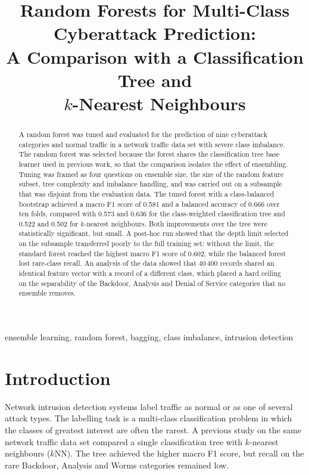 \documentclass[conference,10pt]{IEEEtran}
\begin{document}
\title{Random Forests for Multi-Class Cyberattack Prediction:\\
A Comparison with a Classification Tree and\\ $k$-Nearest Neighbours}

\author{
}

\maketitle

\begin{abstract}
A random forest was tuned and evaluated for the prediction of nine cyberattack categories and normal traffic in a network traffic data set with severe class imbalance. The random forest was selected because the forest shares the classification tree base learner used in previous work, so that the comparison isolates the effect of ensembling. Tuning was framed as four questions on ensemble size, the size of the random feature subset, tree complexity and imbalance handling, and was carried out on a subsample that was disjoint from the evaluation data. The tuned forest with a class-balanced bootstrap achieved a macro F1 score of 0.581 and a balanced accuracy of 0.666 over ten folds, compared with 0.573 and 0.636 for the class-weighted classification tree and 0.522 and 0.502 for $k$-nearest neighbours. Both improvements over the tree were statistically significant, but small. A post-hoc run showed that the depth limit selected on the subsample transferred poorly to the full training set: without the limit, the standard forest reached the highest macro F1 score of 0.602, while the balanced forest lost rare-class recall. An analysis of the data showed that 40\,400 records shared an identical feature vector with a record of a different class, which placed a hard ceiling on the separability of the Backdoor, Analysis and Denial of Service categories that no ensemble removes.
\end{abstract}

\begin{IEEEkeywords}
ensemble learning, random forest, bagging, class imbalance, intrusion detection
\end{IEEEkeywords}

\section{Introduction}
Network intrusion detection systems label traffic as normal or as one of several attack types. The labelling task is a multi-class classification problem in which the classes of greatest interest are often the rarest. A previous study on the same network traffic data set compared a single classification tree with $k$-nearest neighbours ($k$NN). The tree achieved the higher macro F1 score, but recall on the rare Backdoor, Analysis and Worms categories remained low.
\end{document}
